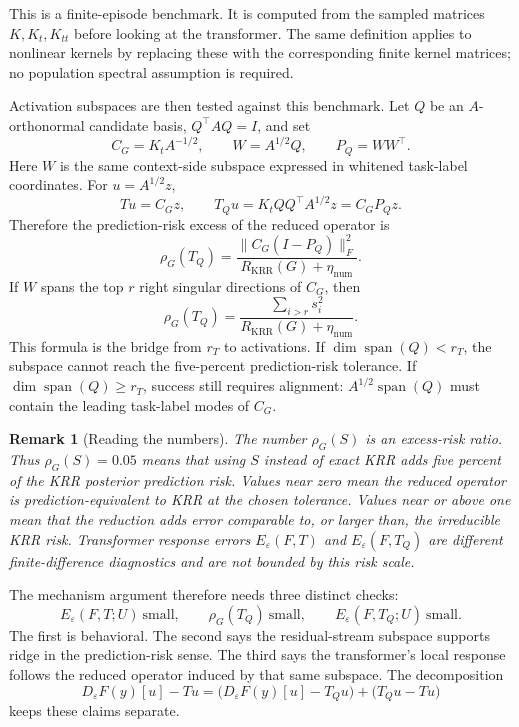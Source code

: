 \documentclass[11pt]{article}
\newtheorem{remark}{Remark}
\newcommand{\spanop}{\operatorname{span}}
\begin{document}
This is a finite-episode benchmark. It is computed from the sampled matrices \(K,K_t,K_{tt}\) before
looking at the transformer. The same definition applies to nonlinear kernels by replacing these with
the corresponding finite kernel matrices; no population spectral assumption is required.

Activation subspaces are then tested against this benchmark. Let \(Q\) be an \(A\)-orthonormal
candidate basis, \(Q^\top A Q=I\), and set
\[
C_G=K_tA^{-1/2},\qquad W=A^{1/2}Q,\qquad P_Q=WW^\top .
\]
Here \(W\) is the same context-side subspace expressed in whitened task-label coordinates. For
\(u=A^{1/2}z\),
\[
Tu=C_Gz,\qquad
T_Qu=K_tQQ^\top A^{1/2}z=C_GP_Qz.
\]
Therefore the prediction-risk excess of the reduced operator is
\[
\rho_G(T_Q)
=
\frac{\|C_G(I-P_Q)\|_F^2}{R_{\mathrm{KRR}}(G)+\eta_{\mathrm{num}}}.
\]
If \(W\) spans the top \(r\) right singular directions of \(C_G\), then
\[
\rho_G(T_Q)
=
\frac{\sum_{i>r}s_i^2}{R_{\mathrm{KRR}}(G)+\eta_{\mathrm{num}}}.
\]
This formula is the bridge from \(r_T\) to activations. If \(\dim\spanop(Q)<r_T\), the subspace
cannot reach the five-percent prediction-risk tolerance. If \(\dim\spanop(Q)\ge r_T\), success still
requires alignment: \(A^{1/2}\spanop(Q)\) must contain the leading task-label modes of \(C_G\).

\begin{remark}[Reading the numbers]
The number \(\rho_G(S)\) is an excess-risk ratio. Thus \(\rho_G(S)=0.05\) means that using \(S\)
instead of exact KRR adds five percent of the KRR posterior prediction risk. Values near zero mean
the reduced operator is prediction-equivalent to KRR at the chosen tolerance. Values near or above
one mean that the reduction adds error comparable to, or larger than, the irreducible KRR risk.
Transformer response errors \(E_\varepsilon(F,T)\) and \(E_\varepsilon(F,T_Q)\) are different
finite-difference diagnostics and are not bounded by this risk scale.
\end{remark}

The mechanism argument therefore needs three distinct checks:
\[
E_\varepsilon(F,T;U)\ \text{small},
\qquad
\rho_G(T_Q)\ \text{small},
\qquad
E_\varepsilon(F,T_Q;U)\ \text{small}.
\]
The first is behavioral. The second says the residual-stream subspace supports ridge in the
prediction-risk sense. The third says the transformer's local response follows the reduced
operator induced by that same subspace. The decomposition
\[
D_\varepsilon F(y)[u]-Tu
=
\bigl(D_\varepsilon F(y)[u]-T_Qu\bigr)
+
\bigl(T_Qu-Tu\bigr)
\]
keeps these claims separate.
\end{document}
